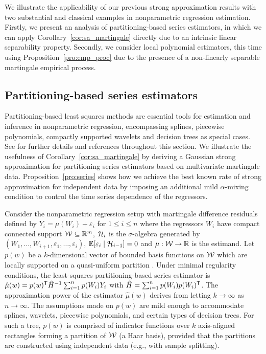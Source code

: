 We illustrate the applicability of our previous strong approximation results
with two substantial and classical examples in nonparametric regression
estimation. Firstly, we present an analysis of partitioning-based series
estimators, in which we can apply Corollary~\ref{cor:sa_martingale} directly
due to an intrinsic linear separability property. Secondly, we consider local
polynomial estimators, this time using Proposition~\ref{pro:emp_proc} due to
the presence of a non-linearly separable martingale empirical process.

\subsection{Partitioning-based series estimators}
\label{sec:series}

Partitioning-based least squares methods are essential tools for estimation and
inference in nonparametric regression, encompassing splines, piecewise
polynomials, compactly supported wavelets and decision trees as special cases.
See \citet{cattaneo2020large} for further details and references throughout
this section. We illustrate the usefulness of Corollary~\ref{cor:sa_martingale}
by deriving a Gaussian strong approximation for partitioning series estimators
based on multivariate martingale data. Proposition~\ref{pro:series} shows how
we achieve the best known rate of strong approximation for independent data by
imposing an additional mild $\alpha$-mixing condition to control the time
series dependence of the regressors.

Consider the nonparametric regression setup with martingale difference
residuals defined by $Y_i = \mu(W_i) + \varepsilon_i$ for $ 1 \leq i \leq n$
where the regressors $W_i$ have compact connected support $\mathcal{W} \subseteq \mathbb{R}^m$,
$\mathcal{H}_i$ is the $\sigma$-algebra generated by
$(W_1, \ldots, W_{i+1}, \varepsilon_1, \ldots, \varepsilon_i)$,
$\mathbb{E}[\varepsilon_i \mid \mathcal{H}_{i-1}] = 0$ and $\mu: \mathcal{W} \to \mathbb{R}$ is the estimand.
Let $p(w)$ be a $k$-dimensional vector of bounded basis functions on $\mathcal{W}$
which are locally supported on a quasi-uniform partition
\citep[Assumption~2]{cattaneo2020large}. Under minimal regularity conditions,
the least-squares partitioning-based series estimator is
$\hat\mu(w) = p(w)^{\mathsf{T}} \hat H^{-1} \sum_{i=1}^n p(W_i) Y_i$
with $\hat H = \sum_{i=1}^n p(W_i) p(W_i)^{\mathsf{T}}$.
The approximation power of the estimator $\hat\mu(w)$ derives from letting
$k\to\infty$ as $n\to\infty$. The assumptions made on $p(w)$ are mild enough to
accommodate splines, wavelets, piecewise polynomials, and certain types of
decision trees. For such a tree, $p(w)$ is comprised of indicator functions
over $k$ axis-aligned rectangles forming a partition of $\mathcal{W}$ (a Haar basis),
provided that the partitions are constructed using independent data
(e.g., with sample splitting).

